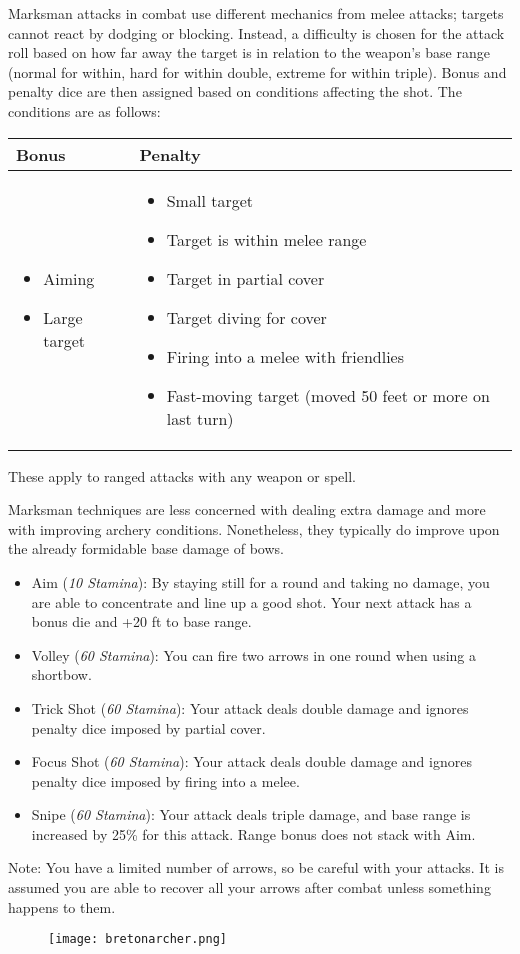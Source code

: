 Marksman attacks in combat use different mechanics from melee attacks; targets cannot react by dodging or blocking. Instead, a difficulty is chosen for the attack roll based on how far away the target is in relation to the weapon's base range (normal for within, hard for within double, extreme for within triple). Bonus and penalty dice are then assigned based on conditions affecting the shot. The conditions are as follows:\\

\begin{tabular}{p{}|p{}}

Bonus & Penalty\\ \hline
	\begin{itemize}
		\item Aiming
		\item Large target
	\end{itemize}
	&
	\begin{itemize}
		\item Small target
		\item Target is within melee range
		\item Target in partial cover
		\item Target diving for cover
		\item Firing into a melee with friendlies
		\item Fast-moving target (moved 50 feet or more on last turn)
	\end{itemize}\\

\end{tabular}

These apply to ranged attacks with any weapon or spell.

Marksman techniques are less concerned with dealing extra damage and more with improving archery conditions. Nonetheless, they typically do improve upon the already formidable base damage of bows.

\begin{itemize}
	\item Aim (\textit{10 Stamina}): By staying still for a round and taking no damage, you are able to concentrate and line up a good shot. Your next attack has a bonus die and +20 ft to base range.
	\item Volley (\textit{60 Stamina}): You can fire two arrows in one round when using a shortbow.
	\item Trick Shot (\textit{60 Stamina}): Your attack deals double damage and ignores penalty dice imposed by partial cover.
	\item Focus Shot (\textit{60 Stamina}): Your attack deals double damage and ignores penalty dice imposed by firing into a melee.
	\item Snipe (\textit{60 Stamina}): Your attack deals triple damage, and base range is increased by 25\% for this attack. Range bonus does not stack with Aim.
\end{itemize}

Note: You have a limited number of arrows, so be careful with your attacks. It is assumed you are able to recover all your arrows after combat unless something happens to them.

\begin{figure}[H]
	\texttt{[image: bretonarcher.png]}
\end{figure}